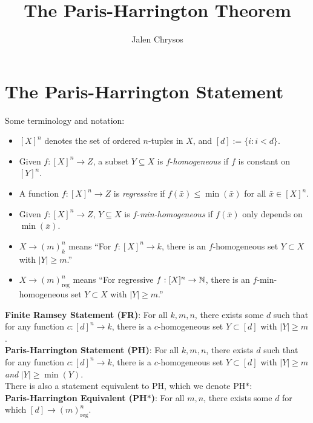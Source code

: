 \documentclass{amsart}
\title{The Paris-Harrington Theorem}
\author{Jalen Chrysos}
\begin{document}
	
	\maketitle
	
	\section{The Paris-Harrington Statement} 
	
	Some terminology and notation:
	\begin{itemize}[leftmargin=10pt]
		\item $[X]^n$ denotes the set of ordered $n$-tuples in $X$, and $[d]:= \{i:i<d\}$.
		\item Given $f:[X]^n\to Z$, a subset $Y\subseteq X$ is $f$-\textit{homogeneous} if $f$ is constant on $[Y]^n$.
		\item A function $f:[X]^n\to Z$ is \textit{regressive} if $f(\bar{x})\leq \min(\bar{x})$ for all $\bar{x}\in [X]^n$.
		\item Given $f:[X]^n\to Z$, $Y\subseteq X$ is $f$-\textit{min-homogeneous} if $f(\bar{x})$ only depends on $\min(\bar{x})$.
		\item $X\to (m)^n_k$ means ``For $f:[X]^n\to k$, there is an $f$-homogeneous set $Y\subset X$ with $|Y|\geq m$.''
		\item $X\to (m)^n_{\text{reg}}$ means ``For regressive $f:[X]^n\to \mathbb{N}$, there is an $f$-min-homogeneous set $Y\subset X$ with $|Y|\geq m$.''\\
	\end{itemize}
	
	\noindent \textbf{Finite Ramsey Statement (FR)}: For all $k,m,n$, there exists some $d$ such that for any function $c:[d]^n\to k$, there is a $c$-homogeneous set $Y\subset [d]$ with $|Y|\geq m$.\\
	
	\noindent \textbf{Paris-Harrington Statement (PH)}: For all $k,m,n$, there exists $d$ such that for any function $c:[d]^n\to k$, there is a $c$-homogeneous set $Y\subset [d]$ with $|Y|\geq m$ \textit{and} $|Y|\geq \min(Y)$.\\
	
	There is also a statement equivalent to PH, which we denote PH$\ast$:\\
	
	\noindent \textbf{Paris-Harrington Equivalent (PH$\ast$)}: For all $m,n$, there exists some $d$ for which $[d]\to (m)^n_{\text{reg}}$.\\
	
\end{document}
